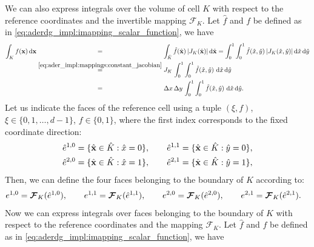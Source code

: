 \documentclass{scrreprt}
\theoremstyle{definition}
\theoremstyle{nonumberplain}
\renewcommand{\vec}[1]{{\textbf{#1}}}
\newcommand{\cell}{K}
\newcommand{\face}{e}
\newcommand{\dV}{\text{d}\vec{x}}
\newcommand{\intCell}{\int_\cell}
\newcommand{\refVec}[1]{\hat{\vec{#1}}}
\newcommand{\refCell}{\hat{\cell}}
\newcommand{\refFace}{\hat{\face}}
\newcommand{\mapping}{\boldsymbol{\mathcal{F}}_{\cell}}
\newcommand{\detJ}{J_\cell}
\newcommand{\intRefCell}{\int_{\hat{\cell}}}
\newcommand{\refdV}{\textup{d}\hat{\vec{x}}}
\newcommand{\refdx}{\textup{d}\hat{x}}
\newcommand{\refdy}{\textup{d}\hat{y}}
\begin{document}
We can also express integrals over the volume of cell $\cell$
with respect to the reference coordinates and the invertible mapping $\mapping$.
Let $\hat{f}$ and $f$ be defined as in \eqref{eq:aderdg_impl:imapping_scalar_function},
we have
\begin{align}
\intCell f(\vec{x})\,\dV
&\overset{\phantom{\eqref{eq:ader_impl:mappings:constant_jacobian}}}{=}
\intRefCell \hat{f}(\refVec{x})\,|\detJ(\refVec{x})|\,\refdV
= \int_{0}^1\int_{0}^1
\hat{f}(\hat{x},\hat{y})\,|\detJ(\hat{x},\hat{y})|\,\refdx\,\refdy \notag\\
&\overset{\eqref{eq:ader_impl:mappings:constant_jacobian}}{=}
\detJ\,
\int_{0}^1\int_{0}^1
\hat{f}(\hat{x},\hat{y})\,\,\refdx\,\refdy
\notag\\
&\overset{\phantom{\eqref{eq:ader_impl:mappings:constant_jacobian}}}{=}
\Delta x\,\Delta y\,
\int_{0}^1\int_{0}^1
\hat{f}(\hat{x},\hat{y})\,\,\refdx\,\refdy.
\notag
\end{align}
Let us indicate the faces of the reference cell
using a tuple $(\xi, f)$, $\xi\in\{0,1,\ldots,d-1\}$, $f\in\{0,1\}$,
where the first index corresponds to the fixed coordinate direction:
\begin{align}
\refFace^{1,0} &= \{ \refVec{x} \in \refCell : \hat{x} = 0\},\qquad
\refFace^{1,1} =  \{ \refVec{x} \in \refCell : \hat{y} = 0\},
\notag\\
\refFace^{2,0} &= \{ \refVec{x} \in \refCell : \hat{x} = 1\},\qquad
\refFace^{2,1} =  \{ \refVec{x} \in \refCell : \hat{y} = 1\},
\notag
\end{align}
Then, we can define the four faces belonging to the boundary of $\cell$
according to:
\begin{align}
\face^{1,0} &= \mapping(\refFace^{1,0}),\qquad
\face^{1,1} =  \mapping(\refFace^{1,1}),\qquad
\face^{2,0} =  \mapping(\refFace^{2,0}),\qquad
\face^{2,1} =  \mapping(\refFace^{2,1}).
\notag
\end{align}
Now we can express integrals over faces belonging to the boundary of $\cell$ with respect to
the reference coordinates and the mapping $\mapping$.
Let $\hat{f}$ and $f$ be defined as in \eqref{eq:aderdg_impl:imapping_scalar_function},
we have
\end{document}

